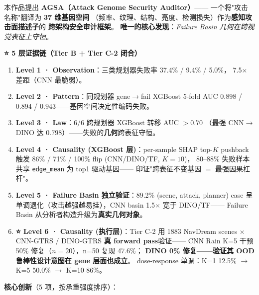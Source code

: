 \documentclass[a4paper,12pt,fontset=fandol]{ctexart}
\newcommand{\gene}[1]{\texttt{#1}}
\begin{document}
本作品提出 \textbf{AGSA（Attack Genome Security Auditor）}——
一个将"攻击名称"翻译为 \textbf{37 维基因空间}
（频率、纹理、结构、亮度、检测损失）作为\textbf{感知攻击面描述子}的
\textbf{跨架构安全审计框架}。
\textbf{唯一的核心发现}：\textit{Failure Basin 几何在跨视觉表征上守恒}。

\begin{center}
\textbf{⭐ 5 层证据链（Tier B + Tier C-2 闭合）}
\end{center}

\begin{enumerate}[leftmargin=*]
\item \textbf{Level 1 · Observation}：三类规划器失败率 37.4\% / 9.4\% / 5.0\%，
      7.5$\times$ 差距（CNN 最脆弱）。
\item \textbf{Level 2 · Pattern}：同规划器 gene$\to$fail XGBoost 5-fold AUC
      $0.898$ / $0.894$ / $\mathbf{0.943}$——基因空间决定性编码失败。
\item \textbf{Level 3 · Law}：6/6 跨规划器 XGBoost 转移 AUC $> 0.70$
      （最强 CNN$\to$DINO 达 $0.798$）——失败的\textbf{几何}跨表征守恒。
\item \textbf{Level 4 · Causality (XGBoost 层)}：per-sample SHAP top-$K$
      pushback 触发 86\% / 71\% / 100\% flip (CNN/DINO/TF, $K\!=\!10$)，
      80--88\% 失败样本共享 \gene{edge\_mean} 为 top1 驱动基因——
      印证"跨表征不变基因 $=$ 最强因果杠杆"。
\item \textbf{Level 5 · Failure Basin 独立验证}：89.2\% (scene, attack, planner)
      case 呈单调退化（攻击越强越易挂），CNN basin 1.5$\times$ 宽于 DINO/TF——
      Failure Basin 从分析者构造升级为\textbf{真实几何对象}。
\item \textbf{⭐ Level 6 · Causality (执行层)}：Tier C-2 用 1883 NavDream
      scenes × CNN-GTRS / DINO-GTRS \textbf{真 forward pass}验证——
      CNN Rain K=5 干预 50\% 修复（$n\!=\!20$），n=50 复现 47.6\%；
      \textbf{DINO 0\% 修复——验证其 OOD 鲁棒性设计意图在 gene 层面也成立}。
      dose-response 单调：K=1 12.5\% $\to$ K=5 50.0\% $\to$ K=10 86\%。
\end{enumerate}

\textbf{核心创新}（5 项，按承重强度排序）：
\end{document}
